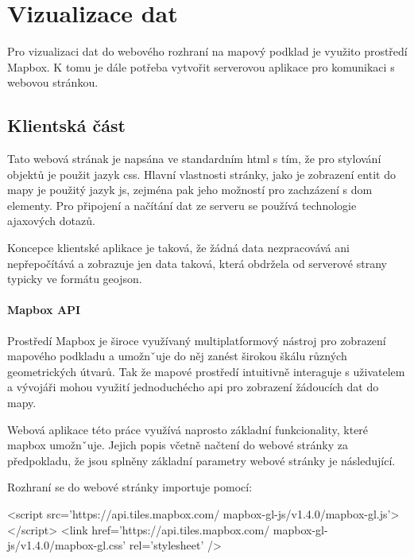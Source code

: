 
\chapter{Vizualizace dat}

Pro vizualizaci dat do webového rozhraní na mapový podklad je využito prostředí Mapbox. K tomu je dále potřeba vytvořit serverovou aplikace pro komunikaci s webovou stránkou.

\section{Klientská část}

Tato webová strának je napsána ve standardním \gls{html} s tím, že pro stylování objektů je použit jazyk \gls{css}. Hlavní vlastnosti stránky, jako je zobrazení entit do mapy je použitý jazyk \gls{js}, zejména pak jeho možností pro zachzázení s \gls{dom} elementy. Pro připojení a načítání dat ze serveru se používá technologie \gls{ajax}ových dotazů.

\bigbreak

Koncepce klientské aplikace je taková, že žádná data nezpracovává ani nepřepočítává a zobrazuje jen data taková, která obdržela od serverové strany typicky ve formátu \gls{geojson}.

\subsubsection{Mapbox API}

Prostředí Mapbox je široce využívaný multiplatformový nástroj pro zobrazení mapového podkladu a umožnˇuje do něj zanést širokou škálu různých geometrických útvarů. Tak že mapové prostředí intuitivně interaguje s uživatelem a vývojáři mohou využití jednoduchécho \gls{api} pro zobrazení žádoucích dat do mapy.

\bigbreak

Webová aplikace této práce využívá naprosto základní funkcionality, které mapbox umožnˇuje. Jejich popis včetně načtení do webové stránky za předpokladu, že jsou splněny základní parametry webové stránky je následující.

\bigbreak

Rozhraní se do webové stránky importuje pomocí:
\begin{code}[frame=none]
<script src='https://api.tiles.mapbox.com/
	mapbox-gl-js/v1.4.0/mapbox-gl.js'></script>
<link href='https://api.tiles.mapbox.com/
	mapbox-gl-js/v1.4.0/mapbox-gl.css' rel='stylesheet' />
\end{code}

